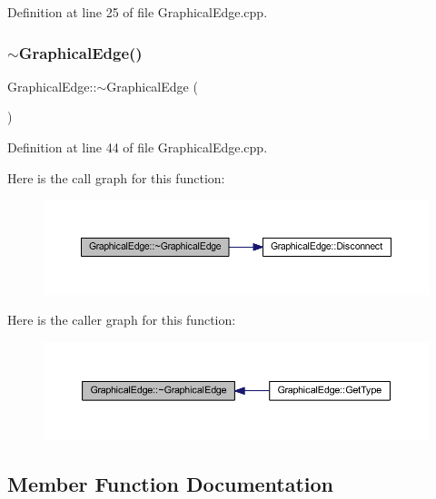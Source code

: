 Definition at line 25 of file Graphical\+Edge.\+cpp.

\mbox{\label{class_graphical_edge_ac19b4561ff4274f8fbbc6700a86b2f27}} 
\subsubsection{\texorpdfstring{$\sim$\+Graphical\+Edge()}{~GraphicalEdge()}}
{\footnotesize\ttfamily Graphical\+Edge\+::$\sim$\+Graphical\+Edge (\begin{DoxyParamCaption}{ }\end{DoxyParamCaption})}



Definition at line 44 of file Graphical\+Edge.\+cpp.

Here is the call graph for this function\+:
\nopagebreak
\begin{figure}[H]
\begin{center}
\leavevmode
\includegraphics[width=350pt]{class_graphical_edge_ac19b4561ff4274f8fbbc6700a86b2f27_cgraph}
\end{center}
\end{figure}
Here is the caller graph for this function\+:
\nopagebreak
\begin{figure}[H]
\begin{center}
\leavevmode
\includegraphics[width=350pt]{class_graphical_edge_ac19b4561ff4274f8fbbc6700a86b2f27_icgraph}
\end{center}
\end{figure}


\subsection{Member Function Documentation}
\mbox{\label{class_graphical_edge_a41868fd50c413744e61a549f1cef6a79}} 
